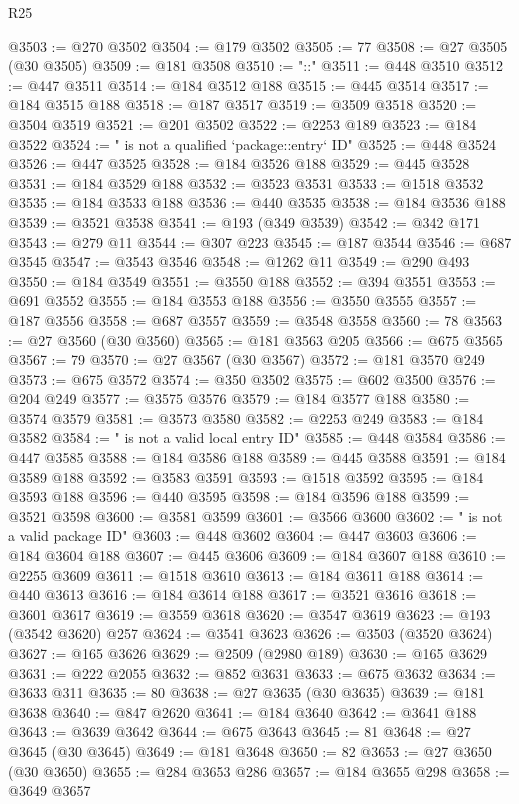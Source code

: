 \begin{lexlean}{R25}
\begin{coremodule}
@3503 := @270 @3502
@3504 := @179 @3502
@3505 := 77
@3508 := @27 @3505 (@30 @3505)
@3509 := @181 @3508
@3510 := "::"
@3511 := @448 @3510
@3512 := @447 @3511
@3514 := @184 @3512 @188
@3515 := @445 @3514
@3517 := @184 @3515 @188
@3518 := @187 @3517
@3519 := @3509 @3518
@3520 := @3504 @3519
@3521 := @201 @3502
@3522 := @2253 @189
@3523 := @184 @3522
@3524 := " is not a qualified `package::entry` ID"
@3525 := @448 @3524
@3526 := @447 @3525
@3528 := @184 @3526 @188
@3529 := @445 @3528
@3531 := @184 @3529 @188
@3532 := @3523 @3531
@3533 := @1518 @3532
@3535 := @184 @3533 @188
@3536 := @440 @3535
@3538 := @184 @3536 @188
@3539 := @3521 @3538
@3541 := @193 (@349 @3539)
@3542 := @342 @171
@3543 := @279 @11
@3544 := @307 @223
@3545 := @187 @3544
@3546 := @687 @3545
@3547 := @3543 @3546
@3548 := @1262 @11
@3549 := @290 @493
@3550 := @184 @3549
@3551 := @3550 @188
@3552 := @394 @3551
@3553 := @691 @3552
@3555 := @184 @3553 @188
@3556 := @3550 @3555
@3557 := @187 @3556
@3558 := @687 @3557
@3559 := @3548 @3558
@3560 := 78
@3563 := @27 @3560 (@30 @3560)
@3565 := @181 @3563 @205
@3566 := @675 @3565
@3567 := 79
@3570 := @27 @3567 (@30 @3567)
@3572 := @181 @3570 @249
@3573 := @675 @3572
@3574 := @350 @3502
@3575 := @602 @3500
@3576 := @204 @249
@3577 := @3575 @3576
@3579 := @184 @3577 @188
@3580 := @3574 @3579
@3581 := @3573 @3580
@3582 := @2253 @249
@3583 := @184 @3582
@3584 := " is not a valid local entry ID"
@3585 := @448 @3584
@3586 := @447 @3585
@3588 := @184 @3586 @188
@3589 := @445 @3588
@3591 := @184 @3589 @188
@3592 := @3583 @3591
@3593 := @1518 @3592
@3595 := @184 @3593 @188
@3596 := @440 @3595
@3598 := @184 @3596 @188
@3599 := @3521 @3598
@3600 := @3581 @3599
@3601 := @3566 @3600
@3602 := " is not a valid package ID"
@3603 := @448 @3602
@3604 := @447 @3603
@3606 := @184 @3604 @188
@3607 := @445 @3606
@3609 := @184 @3607 @188
@3610 := @2255 @3609
@3611 := @1518 @3610
@3613 := @184 @3611 @188
@3614 := @440 @3613
@3616 := @184 @3614 @188
@3617 := @3521 @3616
@3618 := @3601 @3617
@3619 := @3559 @3618
@3620 := @3547 @3619
@3623 := @193 (@3542 @3620) @257
@3624 := @3541 @3623
@3626 := @3503 (@3520 @3624)
@3627 := @165 @3626
@3629 := @2509 (@2980 @189)
@3630 := @165 @3629
@3631 := @222 @2055
@3632 := @852 @3631
@3633 := @675 @3632
@3634 := @3633 @311
@3635 := 80
@3638 := @27 @3635 (@30 @3635)
@3639 := @181 @3638
@3640 := @847 @2620
@3641 := @184 @3640
@3642 := @3641 @188
@3643 := @3639 @3642
@3644 := @675 @3643
@3645 := 81
@3648 := @27 @3645 (@30 @3645)
@3649 := @181 @3648
@3650 := 82
@3653 := @27 @3650 (@30 @3650)
@3655 := @284 @3653 @286
@3657 := @184 @3655 @298
@3658 := @3649 @3657

\end{coremodule}
\end{lexlean}
